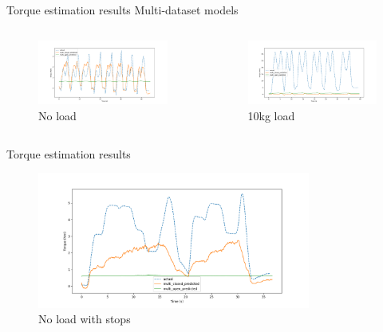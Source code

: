 \documentclass[aspectratio=169]{beamer}
\begin{document}
\begin{frame}{Torque estimation results}
Multi-dataset models
\begin{columns}
\begin{column}{0.5\textwidth}
    \centering
	\begin{figure}[htbp]
	  \centering
	  \includegraphics[width=\textwidth]{multi_open_vs_closed_0g.png}
	  \caption{No load}
	\end{figure}
    \end{column}
    \begin{column}{0.5\textwidth}
	\begin{figure}[htbp]
	  \centering
	  \includegraphics[width=\textwidth]{multi_open_vs_closed_10kg.png}
	  \caption{10kg load}
	\end{figure}
    \end{column}
    \end{columns}
\end{frame}
\begin{frame}{Torque estimation results}
\begin{figure}[htbp]
  \centering
  \includegraphics[width=0.8\textwidth]{multi_open_vs_closed_stops.png}
  \caption{No load with stops}
\end{figure}
\end{frame}
\end{document}
